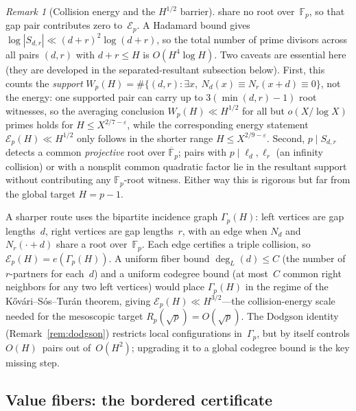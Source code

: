 \documentclass[11pt]{article}
\theoremstyle{definition}
\theoremstyle{remark}
\newtheorem{remark}[theorem]{Remark}
\begin{document}
\begin{remark}[Collision energy and the $H^{1/2}$ barrier]
share no root over~$\mathbb{F}_p$, so that gap pair
contributes zero to~$\mathcal{E}_p$.
A Hadamard bound gives
$\log |S_{d,r}| \ll (d+r)^2 \log(d+r)$, so the total
number of prime divisors across all pairs $(d,r)$ with
$d+r \le H$ is $O(H^4 \log H)$.
Two caveats are essential here
(they are developed in the separated-resultant
subsection below).
First, this counts the \emph{support}
$W_p(H) = \#\{(d,r) : \exists x,\ N_d(x) \equiv
N_r(x{+}d) \equiv 0\}$, not the energy: one supported
pair can carry up to $3(\min(d,r){-}1)$ root witnesses,
so the averaging conclusion
$W_p(H) \ll H^{1/2}$ for all but $o(X/\log X)$ primes
holds for $H \le X^{2/7-\varepsilon}$, while the
corresponding energy statement
$\mathcal{E}_p(H) \ll H^{1/2}$ only follows in the
shorter range $H \le X^{2/9-\varepsilon}$.
Second, $p \mid S_{d,r}$ detects a common
\emph{projective} root over $\overline{\mathbb F}_p$;
pairs with $p \mid \ell_d, \ell_r$ (an infinity
collision) or with a nonsplit common quadratic factor
lie in the resultant support without contributing any
$\mathbb F_p$-root witness.
Either way this is rigorous but far from
the global target $H = p-1$.

A sharper route uses the bipartite incidence graph
$\Gamma_p(H)$: left vertices are gap lengths~$d$, right
vertices are gap lengths~$r$, with an edge when
$N_d$ and~$N_r(\cdot + d)$ share a root
over~$\mathbb{F}_p$.
Each edge certifies a triple collision, so
$\mathcal{E}_p(H) = e(\Gamma_p(H))$.
A uniform fiber bound $\deg_L(d) \le C$ (the number of
$r$-partners for each~$d$) and a uniform codegree
bound (at most~$C$ common right neighbors for any
two left vertices) would place $\Gamma_p(H)$ in the
regime of the K\H{o}v\'ari--S\'os--Tur\'an theorem,
giving $\mathcal{E}_p(H) \ll H^{3/2}$---the
collision-energy scale needed for the
mesoscopic target $R_p(\sqrt{p}) = O(\sqrt{p})$.
The Dodgson identity
(Remark~\ref{rem:dodgson}) restricts local
configurations in~$\Gamma_p$, but by itself controls
$O(H)$~pairs out of~$O(H^2)$; upgrading it to a
global codegree bound is the key missing step.
\end{remark}

\subsection{Value fibers: the bordered certificate}
\label{ssec:value-fibers}
\end{document}
